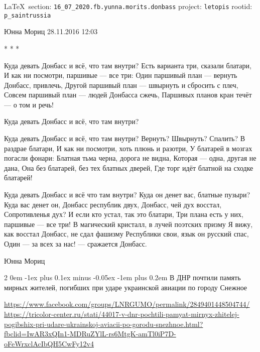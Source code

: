 \documentclass[a4paper,11pt]{extreport}
\makeatletter
\renewcommand\subsection{%
  \clearpage
    \@startsection{subsection}%
    {2}%
    {0em}%
    {-1ex plus 0.1ex minus -0.05ex}%
    {-1em plus 0.2em}%
    {\scshape\bfseries\Large}%
}
\makeatother
\begin{document}
\vspace{0.5cm}
{\ifDEBUG\small\LaTeX~section: \verb|16_07_2020.fb.yunna.morits.donbass| project: \verb|letopis| rootid: \verb|p_saintrussia|\fi}
\vspace{0.5cm}

Юнна Мориц
28.11.2016 12:03

* * *

\obeycr
Куда девать Донбасс и всё, что там внутри?
Есть варианта три, сказали блатари,
И как ни посмотри, паршивые --- все три:
Один паршивый план --- вернуть Донбасс, привлечь,
Другой паршивый план --- швырнуть и сбросить с плеч,
Совсем паршивый план --- людей Донбасса сжечь,
Паршивых планов кран течёт --- о том и речь!

Куда девать Донбасс и всё, что там внутри?

Куда девать Донбасс и всё, что там внутри?
Вернуть? Швырнуть? Спалить? В раздрае блатари,
И как ни посмотри, хоть плюнь и разотри,
У блатарей в мозгах погасли фонари:
Блатная тьма черна, дорога не видна,
Которая --- одна, другая не дана,
Она без блатарей, без тех блатных дверей,
Где торг идёт блатной на сходке блатарей!

Куда девать Донбасс и всё что там внутри?
Куда он денет вас, блатные пузыри?
Куда вас денет он, Донбасс республик двух,
Донбасс, чей дух восстал, Сопротивленья дух?
И если кто устал, так это блатари,
Три плана есть у них, паршивые --- все три!
В магический кристалл, в лучей поэтских призму
Я вижу, как восстал Донбасс, не сдал фашизму
Республики свои, язык он русский спас,
Один --- за всех за нас! --- сражается Донбасс.

Юнна Мориц
\restorecr
{}


 
 

\def\sectitle{В ДНР почтили память мирных жителей, погибших при ударе
украинской авиации по городу Снежное}

\subsection{\sectitle}
\label{sec:16_07_2020.news.dnr.tri_color_center.1}

\url{https://www.facebook.com/groups/LNRGUMO/permalink/2849401448504744/}
\url{https://tricolor-center.ru/stati/44017-v-dnr-pochtili-pamyat-mirnyx-zhitelej-pogibshix-pri-udare-ukrainskoj-aviacii-po-gorodu-snezhnoe.html?fbclid=IwAR3xQIn1-MDRuZYlL-rs6MtgK-amTl0iP7D-oFeWrxclAcIbQH5CwFy12v4}
  
\end{document}
